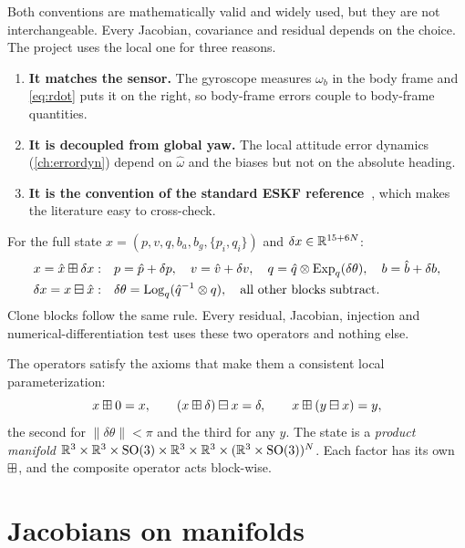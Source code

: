 Both conventions are mathematically valid and widely used, but they are not interchangeable. Every
Jacobian, covariance and residual depends on the choice. The project uses the local one for three
reasons.
\begin{enumerate}
  \item \textbf{It matches the sensor.} The gyroscope measures $\omega_b$ in the body frame and
        \eqref{eq:rdot} puts it on the right, so body-frame errors couple to body-frame quantities.
  \item \textbf{It is decoupled from global yaw.} The local attitude error dynamics
        (\cref{ch:errordyn}) depend on $\hat\omega$ and the biases but not on the absolute heading.
  \item \textbf{It is the convention of the standard ESKF reference~\cite{sola2017quaternion}}, which makes
        the literature easy to cross-check.
\end{enumerate}

\begin{convention}
For the full state $x = (p, v, q, b_a, b_g, \{p_i, q_i\})$ and $\delta x \in \mathbb{R}^{15 + 6N}$:
\begin{align*}
  x = \hat x \boxplus \delta x:&\quad p = \hat p + \delta p,\quad v = \hat v + \delta v,\quad
       q = \hat q\otimes\operatorname{Exp}_q(\delta\theta),\quad b = \hat b + \delta b, \\
  \delta x = x \boxminus \hat x:&\quad \delta\theta = \operatorname{Log}_q(\hat q^{-1}\otimes q),\quad\text{all other blocks subtract.}
\end{align*}
Clone blocks follow the same rule. Every residual, Jacobian, injection and numerical-differentiation test
uses these two operators and nothing else.
\end{convention}

The operators satisfy the axioms that make them a consistent local parameterization:
\begin{equation}
  x \boxplus 0 = x, \qquad (x \boxplus \delta) \boxminus x = \delta, \qquad x \boxplus (y \boxminus x) = y,
\end{equation}
the second for $\|\delta\theta\| < \pi$ and the third for any $y$. The state is a \emph{product manifold}
$\mathbb{R}^3\times\mathbb{R}^3\times\mathrm{SO}(3)\times\mathbb{R}^3\times\mathbb{R}^3\times(\mathbb{R}^3\times\mathrm{SO}(3))^N$. Each factor has its own
$\boxplus$, and the composite operator acts block-wise.

\section{Jacobians on manifolds}
\label{sec:jr}

